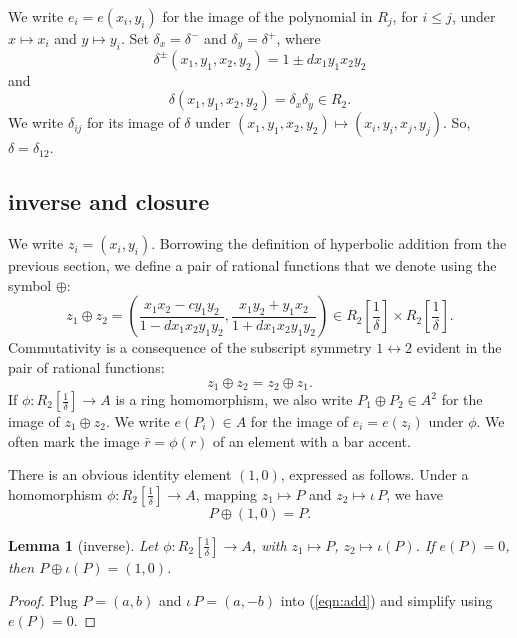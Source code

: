\documentclass[12pt]{article}
\newtheorem{lemma}[theorem]{Lemma}
\newcommand{\f}[1]{\frac{1}{#1}}
\begin{document}
We write $e_i = e(x_i,y_i)$ for the image of the polynomial in $R_j$,
for $i\le j$, under $x\mapsto x_i$ and $y\mapsto y_i$.  Set
$\delta_x = \delta^-$ and $\delta_y = \delta^+$, where
\[\delta^{\pm} (x_1,y_1,x_2,y_2) = 1\pm d x_1 y_1 x_2 y_2\] and
\[
\delta(x_1,y_1,x_2,y_2) = \delta_x\delta_y\in R_2.
\]
We write $\delta_{ij}$ for its image of $\delta$ under
$(x_1,y_1,x_2,y_2)\mapsto (x_i,y_i,x_j,y_j)$.  So,
$\delta=\delta_{12}$.

\subsection{inverse and closure}

We write $z_i = (x_i,y_i)$.
Borrowing the definition of hyperbolic addition from the previous
section, we define a pair of rational functions that we denote using
the symbol $\oplus$:
\begin{equation}\label{eqn:add}
z_1 \oplus z_2 =  \left(\frac{x_1 x_2 - c y_1 y_2}{1 - d x_1 x_2 y_1 y_2},
\frac{x_1 y_2 + y_1 x_2}{1+d x_1 x_2 y_1 y_2}\right) \in R_2[\f{\delta}]\times R_2[\f{\delta}].
\end{equation}
Commutativity is a consequence of the subscript symmetry
$1\leftrightarrow 2$ evident in the pair of rational functions:
\[
z_1 \oplus z_2 = z_2\oplus z_1.
\]
If $\phi:R_2[\f{\delta}]\to A$ is a ring homomorphism, we also write
$P_1\oplus P_2\in A^2$ for the image of $z_1\oplus
z_2$.  We
write $e(P_i)\in A$ for the image of $e_i=e(z_i)$ under
$\phi$.  
We often mark the image
$\bar r=\phi(r)$ of an element with a bar accent.

There is an obvious identity element $(1,0)$, expressed as follows.
Under a homomorphism $\phi:R_2[\f{\delta}]\to A$, mapping
$z_1\mapsto P$ and $z_2\mapsto \iota\,P$, we have
\begin{equation}
P\oplus(1,0) = P.
\end{equation}

\begin{lemma} [inverse] 
  Let $\phi:R_2[\f{\delta}]\to A$, with $z_1\mapsto P$, $z_2\mapsto \iota(P)$.
  If $e(P)=0$, then $P\oplus \iota(P) = (1,0)$.
\end{lemma}

\begin{proof} Plug $P=(a,b)$ and $\iota\,P=(a,-b)$ into (\ref{eqn:add})
  and simplify using $e(P)=0$.
\end{proof}
\end{document}
